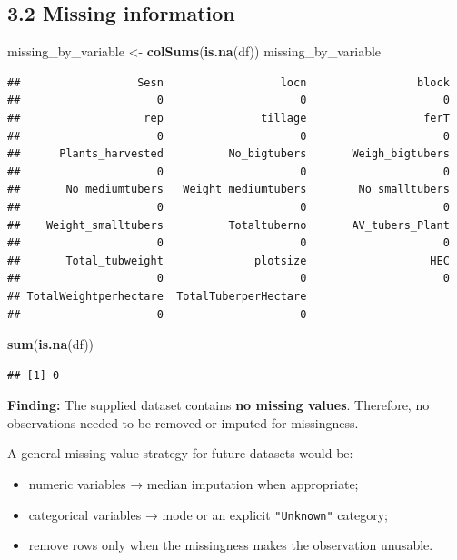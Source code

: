 \documentclass[
]{article}
\newenvironment{Shaded}{\begin{snugshade}}{\end{snugshade}}
\newcommand{\FunctionTok}[1]{\textcolor[rgb]{0.13,0.29,0.53}{\textbf{#1}}}
\newcommand{\NormalTok}[1]{#1}
\newcommand{\OtherTok}[1]{\textcolor[rgb]{0.56,0.35,0.01}{#1}}
\providecommand{\tightlist}{%
  \setlength{\itemsep}{0pt}\setlength{\parskip}{0pt}}
\begin{document}
\subsection{3.2 Missing information}\label{missing-information}

\begin{Shaded}
\begin{Highlighting}[]
\NormalTok{missing\_by\_variable }\OtherTok{\textless{}{-}} \FunctionTok{colSums}\NormalTok{(}\FunctionTok{is.na}\NormalTok{(df))}
\NormalTok{missing\_by\_variable}
\end{Highlighting}
\end{Shaded}

\begin{verbatim}
##                  Sesn                  locn                 block 
##                     0                     0                     0 
##                   rep               tillage                  ferT 
##                     0                     0                     0 
##      Plants_harvested          No_bigtubers       Weigh_bigtubers 
##                     0                     0                     0 
##       No_mediumtubers   Weight_mediumtubers        No_smalltubers 
##                     0                     0                     0 
##    Weight_smalltubers          Totaltuberno       AV_tubers_Plant 
##                     0                     0                     0 
##       Total_tubweight              plotsize                   HEC 
##                     0                     0                     0 
## TotalWeightperhectare  TotalTuberperHectare 
##                     0                     0
\end{verbatim}

\begin{Shaded}
\begin{Highlighting}[]
\FunctionTok{sum}\NormalTok{(}\FunctionTok{is.na}\NormalTok{(df))}
\end{Highlighting}
\end{Shaded}

\begin{verbatim}
## [1] 0
\end{verbatim}

\textbf{Finding:} The supplied dataset contains \textbf{no missing
values}. Therefore, no observations needed to be removed or imputed for
missingness.

A general missing-value strategy for future datasets would be:

\begin{itemize}
\tightlist
\item
  numeric variables → median imputation when appropriate;
\item
  categorical variables → mode or an explicit \texttt{"Unknown"}
  category;
\item
  remove rows only when the missingness makes the observation unusable.
\end{itemize}
\end{document}
